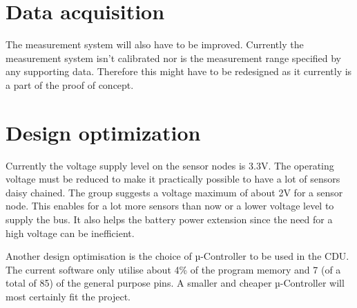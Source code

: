 \section{Data acquisition}
The measurement system will also have to be improved. Currently the measurement system isn't calibrated nor is the measurement range specified by any supporting data. Therefore this might have to be redesigned as it currently is a part of the proof of concept.

\section{Design optimization}
\label{sec:DO}
Currently the voltage supply level on the sensor nodes is 3.3V. The operating voltage must be reduced to make it practically possible to have a lot of sensors daisy chained. The group suggests a voltage maximum of about 2V for a sensor node. This enables for a lot more sensors than now or a lower voltage level to supply the bus. It also helps the battery power extension since the need for a high voltage can be inefficient.

Another design optimisation is the choice of µ-Controller to be used in the CDU. The current software only utilise about 4\% of the program memory and 7 (of a total of 85) of the general purpose pins. A smaller and cheaper µ-Controller will most certainly fit the project.